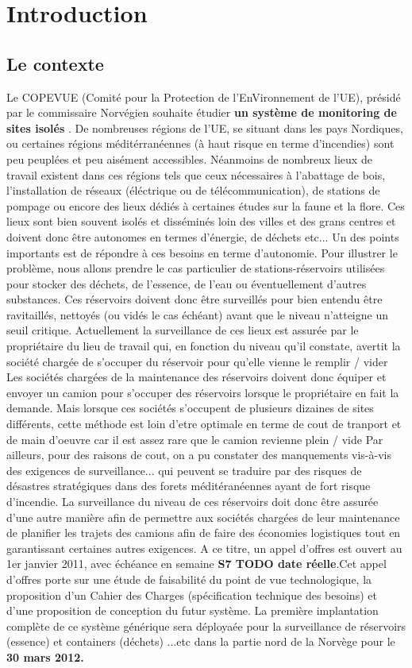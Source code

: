\section{Introduction}

\subsection{Le contexte}
Le COPEVUE (Comité pour la Protection de l'EnVironnement de l'UE), présidé par le commissaire Norvégien souhaite étudier \textbf {un système
de monitoring de sites isolés} .
De nombreuses régions de l'UE, se situant dans les pays Nordiques, ou certaines régions méditérranéennes (à haut risque en terme d'incendies) sont peu peuplées et peu aisément accessibles. Néanmoins
de nombreux lieux de travail existent dans ces régions tels que ceux nécessaires à l'abattage de bois, l'installation de réseaux (éléctrique ou de télécommunication),
de stations de pompage ou encore des lieux dédiés à certaines études sur la faune et la flore. Ces lieux sont bien souvent isolés et disséminés loin des villes et des grans centres et doivent donc être autonomes en termes 
d'énergie, de déchets etc...
Un des points importants est de répondre à ces besoins en terme d'autonomie.
Pour illustrer le problème, nous allons prendre le cas particulier de stations-réservoirs utilisées pour stocker des déchets, de l'essence, de l'eau ou éventuellement d'autres substances. Ces réservoirs doivent donc être
surveillés pour bien entendu être ravitaillés, nettoyés (ou vidés le cas échéant) avant que le niveau n'atteigne un seuil critique. Actuellement la surveillance de ces lieux est assurée par le propriétaire du lieu de travail qui, en fonction du niveau qu'il constate, avertit la société chargée de s'occuper du réservoir pour qu'elle vienne le remplir / vider
Les sociétés chargées de la maintenance des réservoirs doivent donc équiper et envoyer un camion pour s'occuper des réservoirs lorsque le propriétaire en fait la demande. Mais lorsque ces sociétés s'occupent de plusieurs dizaines de sites différents, cette méthode est loin d'etre optimale en terme de cout de tranport et de main d'oeuvre car il est assez rare que le camion revienne plein / vide
Par ailleurs, pour des raisons de cout, on a pu constater des manquements vis-à-vis des exigences de surveillance... qui peuvent se traduire par des risques de désastres stratégiques dans des forets méditéranéennes ayant
de fort risque d'incendie.
La surveillance du niveau de ces réservoirs doit donc être assurée d'une autre manière afin de permettre aux sociétés chargées de leur maintenance de planifier les trajets des camions
afin de faire des économies logistiques tout en garantissant certaines autres exigences.
A ce titre, un appel d'offres est ouvert au 1er janvier 2011, avec échéance en semaine \textbf{S7 TODO date réelle}.Cet appel d'offres porte sur une étude
de faisabilité du point de vue technologique, la proposition d'un Cahier des Charges (spécification technique des besoins) et d'une proposition 
de conception du futur système.
La première implantation complète de ce système générique sera déployaée pour la surveillance de réservoirs (essence) et containers (déchets) ...etc
dans la partie nord de la Norvège pour le \textbf{30 mars 2012.}
